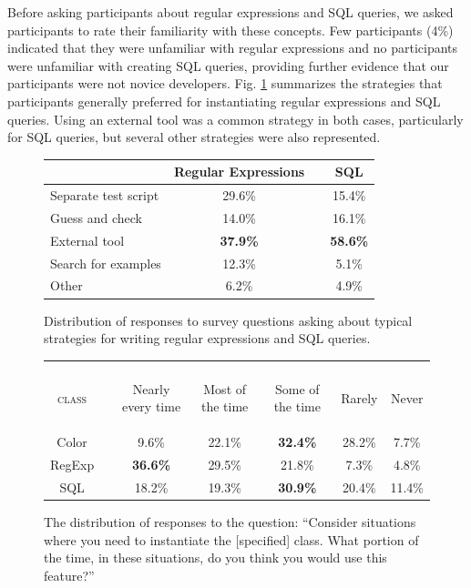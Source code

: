 \documentclass[10pt, conference, compsocconf]{IEEEtran}
\begin{document}
Before asking participants about regular expressions and SQL queries, we asked participants to rate their familiarity with these concepts. Few participants (4\%) indicated that they were unfamiliar with regular expressions and no participants were unfamiliar with creating SQL queries, providing further evidence that our participants were not novice developers. Fig. \ref{strategies} summarizes the strategies that participants generally preferred for instantiating regular expressions and SQL queries. Using an external tool was a common strategy in both cases, particularly for SQL queries, but several other strategies were also represented.

\begin{figure}
\begin{tabular}{lccc}
 & Regular Expressions &  & SQL\\
 \hline
Separate test script & 29.6\% &  & 15.4\%\\
Guess and check & 14.0\% &  & 16.1\%\\
External tool & \textbf{37.9\%} &  & \textbf{58.6\%}\\
Search for examples & 12.3\% & & 5.1\% \\
Other & 6.2\% & & 4.9\% \\
\hline
\end{tabular}
\caption{Distribution of responses to survey questions asking about typical strategies for writing regular expressions and SQL queries.}
\label{strategies}
\end{figure}


\begin{figure}
\begin{tabular}{crccccc}\\\\
\textsc{class}
& 
& \begin{rotate}{20}Nearly every time\end{rotate}
& \begin{rotate}{20}Most of the time\end{rotate}
& \begin{rotate}{20}Some of the time\end{rotate}
& \begin{rotate}{20}Rarely\end{rotate}
& \begin{turn}{20}Never\end{turn}\\
\hline
Color &\vline& 9.6\% & 22.1\% & \textbf{32.4\%} & 28.2\% & 7.7\%\\
RegExp &\vline& \textbf{36.6\%} & 29.5\% & 21.8\% & 7.3\% & 4.8\%\\
SQL & \vline &18.2\% & 19.3\% & \textbf{30.9\%} & 20.4\% & 11.4\%\\
\hline
\end{tabular}
\caption{The distribution of responses to the question: ``Consider situations where you need to instantiate the [specified] class. What portion of the time, in these situations, do you think you would use this feature?''}
\label{frequencies}
\end{figure}
\end{document}
